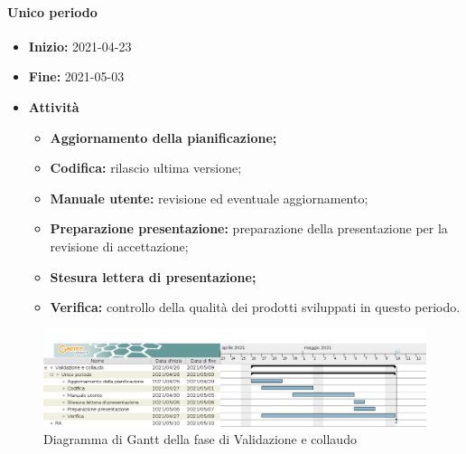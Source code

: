 \paragraph[Unico periodo]{Unico periodo}
\begin{itemize}
    \item [] \textbf{Inizio:} 2021-04-23
    \item [] \textbf{Fine:} 2021-05-03
    \item [] \textbf{Attività}
          \begin{itemize}
              \item \textbf{Aggiornamento della pianificazione;}
              \item \textbf{Codifica:} rilascio ultima versione;
              \item \textbf{Manuale utente:} revisione ed eventuale aggiornamento;
              \item \textbf{Preparazione presentazione:} preparazione della presentazione per la revisione di accettazione;
              \item \textbf{Stesura lettera di presentazione;}
              \item \textbf{Verifica:} controllo della qualità dei prodotti sviluppati in questo periodo.
          \end{itemize}
\end{itemize}

\begin{figure}[H]
    \centering
    \includegraphics[width=1\linewidth]{res/images/pianificazione/validazione_e_collaudo.png}
    \caption{Diagramma di Gantt della fase di Validazione e collaudo}
    \label{fig:_Gantt Validazione e collaudo}
\end{figure}

